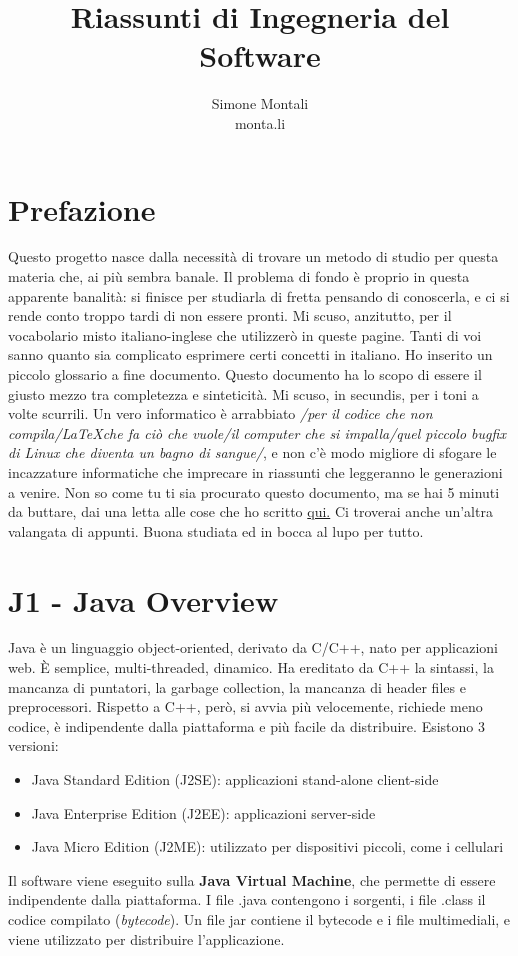 \documentclass[11pt]{article}
\begin{document}
\author{Simone Montali\\monta.li}
\title{Riassunti di Ingegneria del Software}

\maketitle

\medskip
\section*{Prefazione}
Questo progetto nasce dalla necessità di trovare un metodo di studio per questa materia che, ai più sembra banale. Il problema di fondo è proprio in questa apparente banalità: si finisce per studiarla di fretta pensando di conoscerla, e ci si rende conto troppo tardi di non essere pronti. Mi scuso, anzitutto, per il vocabolario misto italiano-inglese che utilizzerò in queste pagine. Tanti di voi sanno quanto sia complicato esprimere certi concetti in italiano. Ho inserito un piccolo glossario a fine documento. Questo documento ha lo scopo di essere il giusto mezzo tra completezza e sinteticità. Mi scuso, in secundis, per i toni a volte scurrili. Un vero informatico è arrabbiato \textit{/per il codice che non compila/\LaTeX  che fa ciò che vuole/il computer che si impalla/quel piccolo bugfix di Linux che diventa un bagno di sangue/}, e non c'è modo migliore di sfogare le incazzature informatiche che imprecare in riassunti che leggeranno le generazioni a venire. 
Non so come tu ti sia procurato questo documento, ma se hai 5 minuti da buttare, dai una letta alle cose che ho scritto \href{https://monta.li/appunti}{qui.} Ci troverai anche un'altra valangata di appunti. Buona studiata ed in bocca al lupo per tutto.
\section{J1 - Java Overview}
Java è un linguaggio object-oriented, derivato da C/C++, nato per applicazioni web. È semplice, multi-threaded, dinamico. Ha ereditato da C++ la sintassi, la mancanza di puntatori, la garbage collection, la mancanza di header files e preprocessori. Rispetto a C++, però, si avvia più velocemente, richiede meno codice, è indipendente dalla piattaforma e più facile da distribuire. Esistono 3 versioni:
\begin{itemize}
    \item Java Standard Edition (J2SE): applicazioni stand-alone client-side
    \item Java Enterprise Edition (J2EE): applicazioni server-side
    \item Java Micro Edition (J2ME): utilizzato per dispositivi piccoli, come i cellulari
\end{itemize}
Il software viene eseguito sulla \textbf{Java Virtual Machine}, che permette di essere indipendente dalla piattaforma. I file .java contengono i sorgenti, i file .class il codice compilato (\textit{bytecode}). Un file jar contiene il bytecode e i file multimediali, e viene utilizzato per distribuire l'applicazione. 
\end{document}
